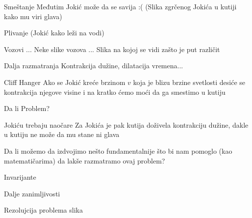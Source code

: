 \documentclass{beamer}
\begin{document}
    \begin{frame}{Smeštanje}
        Međutim Jokić može da se savija :(
        (Slika zgrčenog Jokića u kutiji kako mu viri glava)
    \end{frame}
    \begin{frame}{Plivanje}
        (Jokić kako leži na vodi)
    \end{frame}
    \begin{frame}{Vozovi}
        ... Neke slike vozova
        ... Slika na kojoj se vidi zašto je put različit

    \end{frame}
    \begin{frame}{Dalja razmatranja}
        Kontrakcija dužine, dilatacija vremena...
    \end{frame}
    \begin{frame}{Cliff Hanger}
        Ako se Jokić kreće brzinom $v$ koja je blizu brzine svetlosti
        desiće se kontrakcija njegove visine i na kratko ćemo moći da
        ga smestimo u kutiju
    \end{frame}
    \begin{frame}{Da li}
        Problem?
    \end{frame}
    \begin{frame}{Jokiću trebaju naočare}
        Za Jokića je pak kutija doživela kontrakciju dužine,
        dakle u kutiju ne može da mu stane ni glava
    \end{frame}
    \begin{frame}
        Da li možemo da izdvojimo nešto fundamentalnije što bi nam
        pomoglo (kao matematičarima) da lakše razmatramo ovaj problem?
    \end{frame}
    \begin{frame}{Invarijante}
    \end{frame}
    \begin{frame}{Dalje zanimljivosti}
    \end{frame}
    \begin{frame}{Rezolujcija problema}
        slika
    \end{frame}
\end{document}
